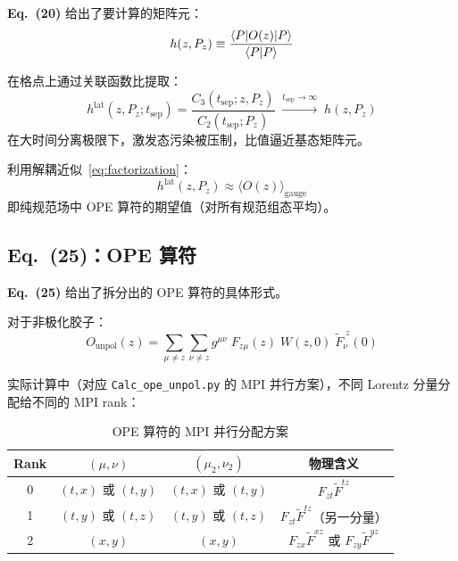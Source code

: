 \documentclass[11pt,a4paper]{ctexart}
\newcommand{\vev}[1]{\langle #1 \rangle}
\begin{document}
\textbf{Eq.~(20)} 给出了要计算的矩阵元：
\begin{equation}
h(z, P_z) \equiv \frac{\braket{P | O(z) | P}}{\braket{P|P}}
\end{equation}

在格点上通过关联函数比提取：
\begin{equation}\label{eq:ratio}
h^{\text{lat}}(z, P_z; t_{\text{sep}}) =
\frac{C_3(t_{\text{sep}}; z, P_z)}{C_2(t_{\text{sep}}; P_z)}
\;\xrightarrow{t_{\text{sep}} \to \infty}\;
h(z, P_z)
\end{equation}
在大时间分离极限下，激发态污染被压制，比值逼近基态矩阵元。

利用解耦近似~\eqref{eq:factorization}：
\begin{equation}
h^{\text{lat}}(z, P_z) \approx \vev{O(z)}_{\text{gauge}}
\end{equation}
即纯规范场中 OPE 算符的期望值（对所有规范组态平均）。

\subsection{Eq.~(25)：OPE 算符}

\textbf{Eq.~(25)} 给出了拆分出的 OPE 算符的具体形式。

对于非极化胶子：
\begin{equation}\label{eq:ope_final}
\boxed{O_{\text{unpol}}(z) = \sum_{\mu \neq z} \sum_{\nu \neq z} g^{\mu\nu} \;
F_{z\mu}(z) \; W(z, 0) \; \tilde{F}_{\nu}^{\;z}(0)}
\end{equation}

实际计算中（对应 \texttt{Calc\_ope\_unpol.py} 的 MPI 并行方案），不同 Lorentz 分量分配给不同的 MPI rank：

\begin{table}[htbp]
\centering
\caption{OPE 算符的 MPI 并行分配方案}
\begin{tabular}{c c c c}
\toprule
\textbf{Rank} & \textbf{$(\mu,\nu)$} & \textbf{$(\mu_2,\nu_2)$} & \textbf{物理含义} \\
\midrule
0 & $(t, x)$ 或 $(t, y)$ & $(t, x)$ 或 $(t, y)$ & $F_{zt}\tilde{F}^{tz}$ \\
1 & $(t, y)$ 或 $(t, z)$ & $(t, y)$ 或 $(t, z)$ & $F_{zt}\tilde{F}^{tz}$（另一分量）\\
2 & $(x, y)$ & $(x, y)$ & $F_{zx}\tilde{F}^{xz}$ 或 $F_{zy}\tilde{F}^{yz}$ \\
\bottomrule
\end{tabular}
\end{table}
\end{document}
